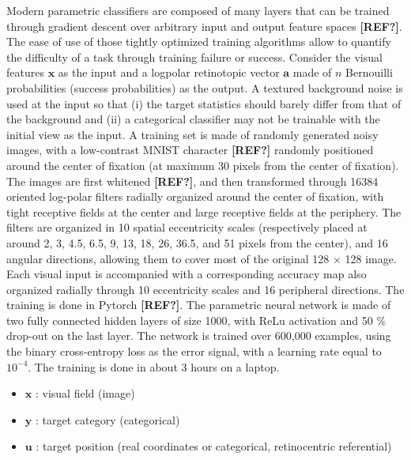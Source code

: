 \CNS
Modern parametric classifiers are composed of many layers that can be trained through gradient descent over arbitrary input and output feature spaces {\bf [REF?]}. The ease of use of those tightly optimized training algorithms allow to quantify the difficulty of a task through training failure or success. Consider the visual features  $\boldsymbol{x}$ as the input and a logpolar retinotopic vector $\boldsymbol{a}$ made of $n$ Bernouilli probabilities (success probabilities) as the output. A textured background noise is used at the input so that (i) the target statistics should barely differ from that of the background and (ii) a  categorical classifier may not be trainable with the initial view as the input. A training set is made of randomly generated noisy images, with a low-contrast MNIST character {\bf [REF?]} randomly positioned around the center of fixation (at maximum 30 pixels from the center of fixation). The images are first whitened {\bf [REF?]}, and then transformed through 16384 oriented log-polar filters radially organized around the center of fixation, with tight receptive fields at the center and large receptive fields at the periphery. The filters are organized in 10 spatial eccentricity scales (respectively placed at around 2, 3, 4.5, 6.5, 9, 13, 18, 26, 36.5, and 51 pixels from the center), and 16 angular directions, allowing them to cover most of the original 128 $\times$ 128 image. Each visual input is accompanied with a corresponding accuracy map also organized radially through 10 eccentricity scales and 16 peripheral directions. The training is done in Pytorch {\bf [REF?]}. The parametric neural network is made of two fully connected hidden layers of size 1000, with ReLu activation and 50 \% drop-out on the last layer. The network is trained over 600,000 examples, using the binary cross-entropy loss as the error signal, with a learning rate equal to $10^{-4}$. The training is done in about 3 hours on a laptop.  


\fi



\CNS

\begin{itemize}
	\item $\boldsymbol{x}$ : visual field (image)
	\item $\boldsymbol{y}$ : target category (categorical)
	\item $\boldsymbol{u}$ : target position (real coordinates or categorical, retinocentric referential)

\end{itemize}

